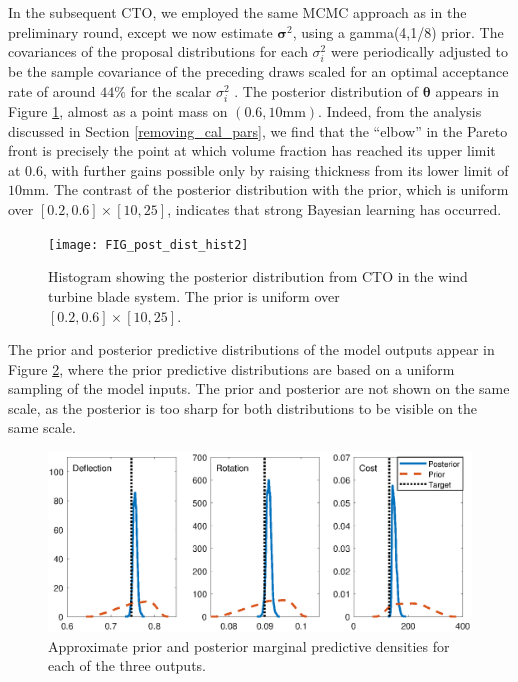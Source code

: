 \documentclass[twocolumn,10pt]{asme2ej}
\begin{document}
%
In the subsequent CTO, we employed the same MCMC approach as in the preliminary round, except we now estimate $\boldsymbol\sigma^2$, using a gamma(4,1/8) prior.
%
The covariances of the proposal distributions for each $\sigma^2_i$ were periodically adjusted to be the sample covariance of the preceding draws scaled for an optimal acceptance rate of around $44\%$ for the scalar $\sigma^2_i$ \cite{Roberts1997,Gelman2013}.
%
The posterior distribution of $\boldsymbol\theta$ appears in Figure \ref{fig:wt_marg_post}, almost as a point mass on $(0.6, 10\mathrm{mm})$.
%
Indeed, from the analysis discussed in Section \ref{removing_cal_pars}, we find that the ``elbow'' in the Pareto front is precisely the point at which volume fraction has reached its upper limit at $0.6$, with further gains possible only by raising thickness from its lower limit of $10$mm.
%
The contrast of the posterior distribution with the prior, which is uniform over $[0.2,0.6]\times[10,25]$, indicates that strong Bayesian learning has occurred.
%
\begin{figure}
	\centering
	\texttt{[image: FIG\_post\_dist\_hist2]}
	\caption{Histogram showing the posterior distribution from CTO in the wind turbine blade system. The prior is uniform over $[0.2,0.6]\times[10,25]$.}
	\label{fig:wt_marg_post}
\end{figure}
%
The prior and posterior predictive distributions of the model outputs appear in Figure \ref{fig:prior_post_pred_comp}, where the prior predictive distributions are based on a uniform sampling of the model inputs.
%
The prior and posterior are not shown on the same scale, as the posterior is too sharp for both distributions to be visible on the same scale.
%
\begin{figure}[h]
	\centering
	\includegraphics[scale=0.85]{FIG_prior_vs_posterior_dist}
	\caption{Approximate prior and posterior marginal predictive densities for each of the three outputs.}
	\label{fig:prior_post_pred_comp}
\end{figure}
\end{document}
